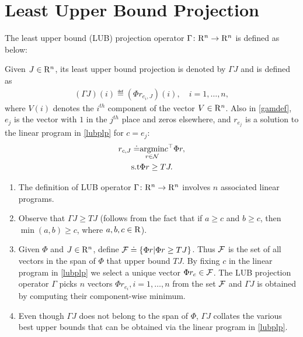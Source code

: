 \section{Least Upper Bound Projection}\label{sec:lubp}
The least upper bound (LUB) projection operator $\Gamma \colon \mathrm{R}^n \rightarrow\mathrm{R}^n$ is defined as below:
\begin{definition}\label{lubpop}
Given $J\in \mathrm{R}^n$, its least upper bound projection is denoted by $\Gamma J$ and is defined as 
\begin{align}\label{gamdef}
(\Gamma J)(i)\eqdef(\Phi r_{e_i,J})(i),\quad i=1,\ldots,n,
\end{align}
where $V(i)$ denotes the $i^{th}$ component of the vector $V\in \mathrm{R}^n$. Also in \eqref{gamdef}, $e_j$ is the vector with $1$ in the $j^{th}$ place and zeros elsewhere, and $r_{e_j}$ is a solution to the linear program in \eqref{lubplp} for $c=e_j$:
\begin{align}\label{lubplp}
 r_{c,J}   \eqdef& \underset{r\in \N}{\argmin} \mbox{ } c^\top \Phi r,\nn\\
 \text{s.t}& \mb \Phi r\geq  TJ.
\end{align}
\end{definition}
\begin{remark}
\begin{enumerate}
\item The definition of LUB operator $\Gamma \colon \mathrm{R}^n \rightarrow \mathrm{R}^n$ involves $n$ associated linear programs.
\item Observe that $\Gamma J\geq TJ$ (follows from the fact that if $a\geq c$ and $b\geq c$, then $\min(a,b)\geq c$, where $a, b, c \in \mathrm{R}$).
\item Given $\Phi$ and $J\in \mathrm{R}^n$, define $\mathcal{F}\doteq\{\Phi r|\Phi r\geq TJ\}$. Thus $\mathcal{F}$ is the set of all vectors in the span of $\Phi$ that upper bound $TJ$. By fixing $c$ in the linear program in \eqref{lubplp} we select a unique vector $\Phi r_c \in \mathcal{F}$. The LUB projection operator $\Gamma$ picks $n$ vectors $\Phi r_{e_i},i=1,\ldots,n$ from the set $\mathcal{F}$ and $\Gamma J$ is obtained by computing their component-wise minimum.
\item Even though $\Gamma J$ does not belong to the span of $\Phi$, $\Gamma J$ collates the various best upper bounds that can be obtained via the linear program in \eqref{lubplp}.
\begin{comment}
\item The LUB operator $\Gamma$ in \eqref{gamdef} bears close similarity to the ALP in \eqref{alp}.
In fact, it is not hard to observe that $(\Gamma J)(i) = (\Phi r_{e_i})(i)$ for any $1\le i \le n$; the reason $\Gamma$ is defined the way it is so that this resembles to \eqref{alp} will be clear. 
\end{comment}
\end{enumerate}
\end{remark}
